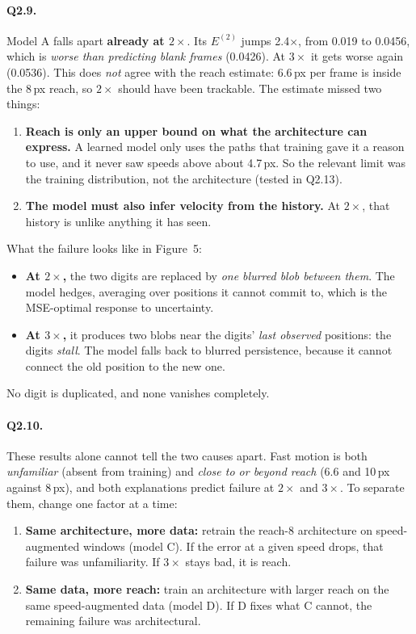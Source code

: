 \documentclass[11pt,a4paper]{article}
\begin{document}
\paragraph{Q2.9.} Model A falls apart \textbf{already at $2\times$}. Its
$E^{(2)}$ jumps 2.4$\times$, from 0.019 to 0.0456, which is \emph{worse than
predicting blank frames} (0.0426). At $3\times$ it gets worse again (0.0536).
This does \emph{not} agree with the reach estimate: 6.6\,px per frame is inside
the 8\,px reach, so $2\times$ should have been trackable. The estimate missed
two things:
\begin{enumerate}[label=(\roman*), leftmargin=*]
  \item \textbf{Reach is only an upper bound on what the architecture can
        express.} A learned model only uses the paths that training gave it a
        reason to use, and it never saw speeds above about 4.7\,px. So the
        relevant limit was the training distribution, not the architecture
        (tested in Q2.13).
  \item \textbf{The model must also infer velocity from the history.} At
        $2\times$, that history is unlike anything it has seen.
\end{enumerate}
What the failure looks like in Figure~5:
\begin{itemize}
  \item \textbf{At $2\times$,} the two digits are replaced by \emph{one blurred
        blob between them}. The model hedges, averaging over positions it
        cannot commit to, which is the MSE-optimal response to uncertainty.
  \item \textbf{At $3\times$,} it produces two blobs near the digits'
        \emph{last observed} positions: the digits \emph{stall}. The model
        falls back to blurred persistence, because it cannot connect the old
        position to the new one.
\end{itemize}
No digit is duplicated, and none vanishes completely.

\paragraph{Q2.10.} These results alone cannot tell the two causes apart. Fast
motion is both \emph{unfamiliar} (absent from training) and \emph{close to or
beyond reach} (6.6 and 10\,px against 8\,px), and both explanations predict
failure at $2\times$ and $3\times$. To separate them, change one factor at a
time:
\begin{enumerate}[leftmargin=*]
  \item \textbf{Same architecture, more data:} retrain the reach-8 architecture
        on speed-augmented windows (model C). If the error at a given speed
        drops, that failure was unfamiliarity. If $3\times$ stays bad, it is
        reach.
  \item \textbf{Same data, more reach:} train an architecture with larger reach
        on the same speed-augmented data (model D). If D fixes what C cannot,
        the remaining failure was architectural.
\end{enumerate}
\end{document}
